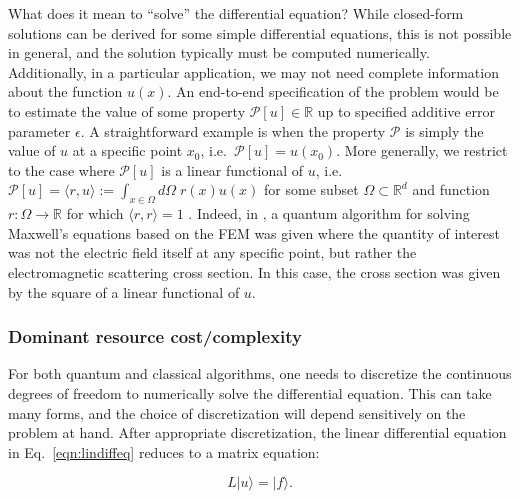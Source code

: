 \begin{refsection}
What does it mean to ``solve'' the differential equation? While closed-form solutions can be derived for some simple differential equations,  this is not possible in general, and the solution typically must be computed numerically. Additionally, in a particular application, we may not need complete information about the function $u(x)$. An end-to-end specification of the problem would be to estimate the value of some property $\mathcal{P}[u] \in \mathbb{R}$ up to specified additive error parameter $\epsilon$.  A straightforward example is when the property $\mathcal{P}$ is simply the value of $u$ at a specific point $x_0$, i.e.~$\mathcal{P}[u] = u(x_0)$. More generally, we restrict to the case where $\mathcal{P}[u]$ is a linear functional of $u$, i.e.~$\mathcal{P}[u] = \langle r, u\rangle := \int_{x \in \Omega} d\Omega \; r(x)u(x)$ for some subset $\Omega \subset \mathbb{R}^d$ and function $r:\Omega \rightarrow \mathbb{R}$ for which $\langle r, r \rangle = 1$ \cite{montanaro2016quantum}. Indeed, in \cite{clader2013preconditioned}, a quantum algorithm for solving Maxwell's equations based on the FEM was given where the quantity of interest was not the electric field itself at any specific point, but rather the electromagnetic scattering cross section. In this case, the cross section was given by the square of a linear functional of $u$.

\subsubsection*{Dominant resource cost/complexity}

For both quantum and classical algorithms, one needs to discretize the continuous degrees of freedom to numerically solve the differential equation. This can take many forms, and the choice of discretization will depend sensitively on the problem at hand. After appropriate discretization,  the linear differential equation in Eq.~\eqref{eqn:lindiffeq} reduces to a matrix equation:

\begin{equation}
    L|u\rangle=|f\rangle.
\end{equation}


\end{refsection}

